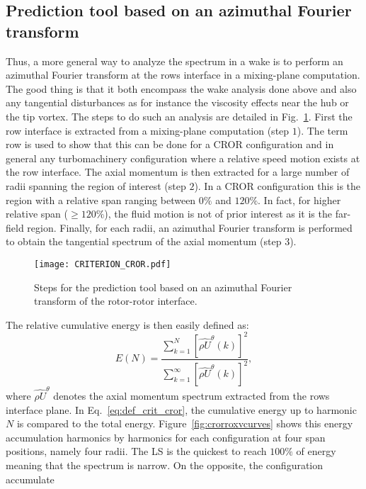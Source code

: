 \subsection{Prediction tool based on an azimuthal Fourier transform}
Thus, a more general way to analyze the spectrum in a wake is
to perform an azimuthal Fourier transform at the rows interface
in a mixing-plane computation. The good thing is
that it both encompass the wake analysis done above and also
any tangential disturbances as for instance
the viscosity effects near the hub or the tip vortex.
The steps to do such an analysis are detailed in
Fig.~\ref{fig:criterion_cror}. First the row
interface is extracted from a mixing-plane computation 
(step \textcircled{\small{$1$}}).
The term row is used to show that this can be done
for a CROR configuration and in general any turbomachinery
configuration where a relative speed motion exists at
the row interface.
The axial momentum is then extracted for a large
number of radii spanning the region of interest
(step \textcircled{\small{$2$}}).
In a CROR configuration this is the region with a 
relative span ranging between $0\%$ and $120\%$.
In fact, for higher relative span ($\geq 120\%$), the fluid motion
is not of prior interest as it is the far-field region.
Finally, for each radii, an azimuthal Fourier transform
is performed to obtain the tangential spectrum of the
axial momentum (step \textcircled{\small{$3$}}).
\begin{figure}[htbp]
  \centering
  \texttt{[image: CRITERION\_CROR.pdf]}
  \caption{Steps for the prediction tool based on an azimuthal
  Fourier transform of the rotor-rotor interface.}
  \label{fig:criterion_cror}
\end{figure}
The relative cumulative energy is then easily defined as:
\begin{equation}
    E (N) = \frac{\sum_{k=1}^N \left[ \widehat{\rho U}^{\theta} (k) \right]^2}{ 
    \sum_{k=1}^\infty \left[ \widehat{\rho U}^{\theta} (k) \right]^2},
    \label{eq:def_crit_cror}
\end{equation} 
where $\widehat{\rho U}^{\theta}$ denotes the axial momentum spectrum
extracted from the rows interface plane. In Eq.~\eqref{eq:def_crit_cror},
the cumulative energy up to harmonic $N$ is 
compared to the total energy.
Figure~\ref{fig:crorroxvcurves} shows this energy accumulation
harmonics by harmonics for each configuration at four span
positions, namely four radii. The LS
\mockup is the quickest to reach $100\%$ of energy meaning that the
spectrum is narrow. On the opposite, the \aipx configuration accumulate
